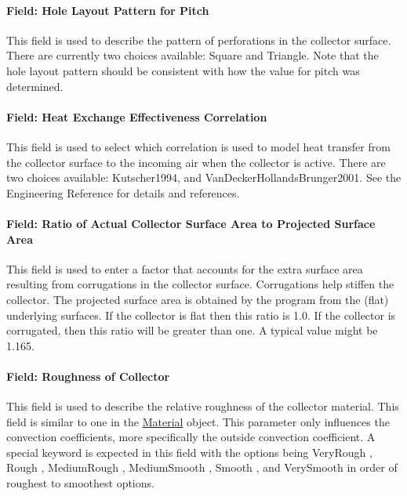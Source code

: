 \paragraph{Field: Hole Layout Pattern for Pitch}\label{field-hole-layout-pattern-for-pitch}

This field is used to describe the pattern of perforations in the collector surface. There are currently two choices available: Square and Triangle. Note that the hole layout pattern should be consistent with how the value for pitch was determined.

\paragraph{Field: Heat Exchange Effectiveness Correlation}\label{field-heat-exchange-effectiveness-correlation}

This field is used to select which correlation is used to model heat transfer from the collector surface to the incoming air when the collector is active. There are two choices available: Kutscher1994, and VanDeckerHollandsBrunger2001. See the Engineering Reference for details and references.

\paragraph{Field: Ratio of Actual Collector Surface Area to Projected Surface Area}\label{field-ratio-of-actual-collector-surface-area-to-projected-surface-area}

This field is used to enter a factor that accounts for the extra surface area resulting from corrugations in the collector surface. Corrugations help stiffen the collector. The projected surface area is obtained by the program from the (flat) underlying surfaces. If the collector is flat then this ratio is 1.0. If the collector is corrugated, then this ratio will be greater than one. A typical value might be 1.165.

\paragraph{Field: Roughness of Collector}\label{field-roughness-of-collector}

This field is used to describe the relative roughness of the collector material. This field is similar to one in the \hyperref[material]{Material} object. This parameter only influences the convection coefficients, more specifically the outside convection coefficient. A special keyword is expected in this field with the options being VeryRough , Rough , MediumRough , MediumSmooth , Smooth , and VerySmooth in order of roughest to smoothest options.

